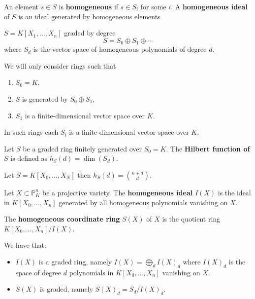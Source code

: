 \documentclass[12pt, a4paper]{article}
\newcommand{\PP}{\mathbb P}
\begin{document}
\begin{definition}
    An element \(s\in S\) is \textbf{homogeneous} if \(s\in S_i\) for some \(i\). A \textbf{homogeneous ideal} of \(S\) is an ideal generated by homogeneous elements. 
\end{definition}

\begin{example}
    \(S= K[X_1,\ldots,X_n]\) graded by degree 
    \[S = S_0 \oplus S_1 \oplus \cdots\]
    where \(S_d\) is the vector space of homogeneous polynomials of degree \(d\).
\end{example}

\begin{mdremark}
    We will only consider rings such that 
    \begin{enumerate}
        \item \(S_0 = K\),
        \item \(S\) is generated by \(S_0 \oplus S_1\),
        \item \(S_1\) is a finite-dimensional vector space over \(K\).
    \end{enumerate}
    In such rings each \(S_i\) is a finite-dimensional vector space over \(K\).
\end{mdremark}

\begin{definition}
    Let \(S\) be a graded ring finitely generated over \(S_0 = K\). The \textbf{Hilbert function of \(S\)} is defined as \(h_S(d)=\dim(S_d)\).
\end{definition}

\begin{mdexample}
    Let \(S = K[X_0,\ldots,X_N]\) then \(h_S(d)  = \binom{n+d}{d}\).
\end{mdexample}

\begin{definition}
    Let \(X \subset \PP^n_K\) be a projective variety. The \textbf{homogeneous ideal} \(I(X)\) is the ideal in \(K[X_0,\ldots,X_n]\) generated by all \ul{homogeneous} polynomials vanishing on \(X\).
\end{definition}

\begin{definition}
    The \textbf{homogeneous coordinate ring} \(S(X)\) of \(X\) is the quotient ring \(K[X_0,\ldots,X_n]/I(X)\).
\end{definition}

\begin{mdprop}
    We have that:
    \begin{itemize}
        \item \(I(X)\) is a graded ring, namely \(I(X) = \bigoplus_d I(X)_d\) where \(I(X)_d\) is the space of degree \(d\) polynomials in \(K[X_0,\ldots,X_n]\) vanishing on \(X\).
        \item \(S(X)\) is graded, namely \(S(X)_d =S_d/I(X)_d\).
    \end{itemize}
\end{mdprop}
\end{document}
